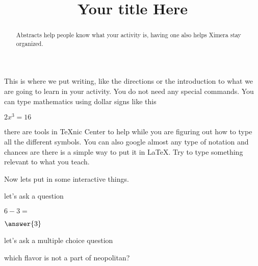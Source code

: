 \documentclass{ximera}%
\title{Your title Here}%
\begin{document}
\begin{abstract}
Abstracts help people know what your activity is, having one also helps Ximera stay organized.
\end{abstract}
\maketitle %
This is where we put writing, like the directions or the introduction to what we are going to learn in your activity. You do not need any special commands. You can type mathematics using dollar signs like this
 
$2x^3=16$

there are tools in TeXnic Center to help while you are figuring out how to type all the different symbols. You can also google almost any type of notation and chances are there is a simple way to put it in LaTeX. Try to type something relevant to what you teach.

Now lets put in some interactive things.

let's ask a question

\begin{question} $6-3=$ 
\begin{prompt}$\answer{3}$
\end{prompt}
\end{question}

let's ask a multiple choice question
\begin{question} which flavor is not a part of neopolitan?
\begin{multipleChoice}
\end{multipleChoice}
\end{question}
\end{document}
